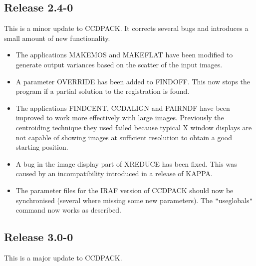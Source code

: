 \documentclass[twoside,11pt]{article}
\newcommand{\htmlref}[2]{#1}
\renewcommand{\_}{\texttt{\symbol{95}}}
\newcommand{\qt}[1]{{\tt "}#1{\tt "}}
\newcommand{\xroutine}[1]{\htmlref{{\sc #1}}{#1}}
\begin{document}
\subsection{Release 2.4-0}
This is a minor update to CCDPACK. It corrects several bugs and
introduces a small amount of new functionality.
\begin{itemize}
\item The applications \xroutine{MAKEMOS} and \xroutine{MAKEFLAT} have
  been modified to generate output variances based on the scatter of
  the input images.
\item A parameter OVERRIDE has been added to \xroutine{FINDOFF}. This
  now stops the program if a partial solution to the registration is
  found.
\item The applications \xroutine{FINDCENT}, \xroutine{CCDALIGN}
      and \xroutine{PAIRNDF} have been improved to work more
      effectively with large images. Previously the centroiding
      technique they used failed because typical X window displays
      are not capable of showing images at sufficient
      resolution to obtain a good starting position.
\item A bug in the image display part of \xroutine{XREDUCE} has been
        fixed. This was caused by an incompatibility introduced in a
        release of KAPPA.
\item The parameter files for the IRAF version of CCDPACK should now
      be synchronised (several where missing some new parameters). The
      \qt{use\_globals} command now works as described.
\end{itemize}


\subsection{Release 3.0-0}

This is a major update to CCDPACK.
\end{document}
